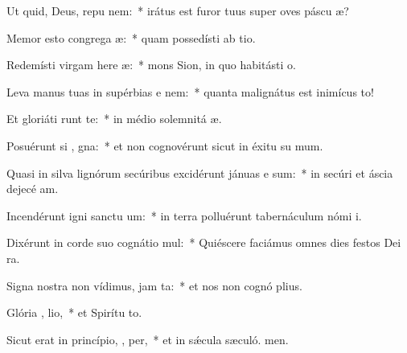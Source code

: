 \item Ut quid, Deus, repu  nem:~* irátus est furor tuus super oves páscu æ?
\item Memor esto congrega æ:~* quam possedísti ab tio.
\item Redemísti virgam here æ:~* mons Sion, in quo habitásti  o.
\item Leva manus tuas in supérbias e  nem:~* quanta malignátus est inimícus  to!
\item Et gloriáti   runt te:~* in médio solemnitá æ.
\item Posuérunt si , gna:~* et non cognovérunt sicut in éxitu su mum.
\item Quasi in silva lignórum secúribus excidérunt jánuas e  sum:~* in secúri et áscia dejecé am.
\item Incendérunt igni sanctu um:~* in terra polluérunt tabernáculum nómi i.
\item Dixérunt in corde suo cognátio  mul:~* Quiéscere faciámus omnes dies festos Dei  ra.
\item Signa nostra non vídimus, jam   ta:~* et nos non cognó plius.
\item Glória ,  lio,~* et Spirítu to.
\item Sicut erat in princípio,  ,  per,~* et in sǽcula sæculó. men.
